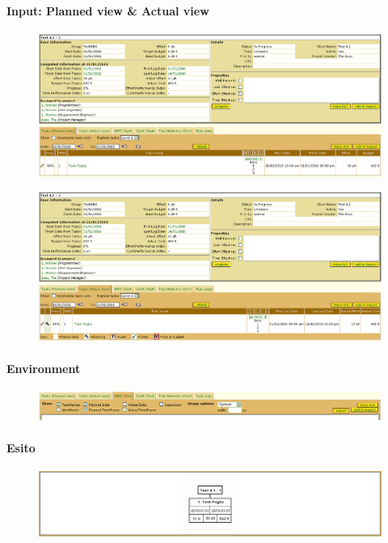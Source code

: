 \paragraph{Input: Planned view & Actual view}
\begin{figure}[h!]
\centering
\includegraphics[width=\textwidth]{tests/TEST_WBS/4.1/4.1_1/Esempio_2/input.png}
\end{figure}
\begin{figure}[h!]
\centering
\includegraphics[width=\textwidth]{tests/TEST_WBS/4.1/4.1_1/Esempio_2/input_actual.png}
\end{figure}
\newpage

\paragraph{Environment}
\begin{figure}[h!]
\centering
\includegraphics[width=\textwidth]{tests/TEST_WBS/4.1/4.1_1/Esempio_2/environment.png}
\end{figure}

\paragraph{Esito}
\begin{figure}[h!]
\centering
\includegraphics[width=\textwidth]{tests/TEST_WBS/4.1/4.1_1/Esempio_2/output.png}
\end{figure}
\newpage




